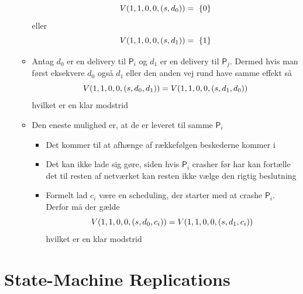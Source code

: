 \documentclass[a4, english]{article}
\begin{document}
\begin{itemize}
\begin{itemize}
\begin{equation*}
      V(1,1,0,0, (s,d_0)) = \ \{0\} \\
    \end{equation*}
    eller
    \begin{equation*}
      V(1,1,0,0, (s,d_1)) = \ \{1\} \\
    \end{equation*}
    \item Antag $d_0$ er en delivery til $\mathsf P_i$ og $d_1$ er en delivery til $\mathsf P_j$. Dermed hvis man først eksekvere $d_0$ også $d_1$ eller den anden vej rund have samme effekt så
    \begin{equation*}
      V(1,1,0,0, (s,d_0,d_1)) = V(1,1,0,0, (s,d_1,d_0)) \\
    \end{equation*}
    hvilket er en klar modstrid
    \item Den eneste mulighed er, at de er leveret til samme $\mathsf P_i$
    \begin{itemize}
    	\item Det kommer til at afhænge af rækkefølgen beskederne kommer i
      \item Det kan ikke lade sig gøre, siden hvis $\mathsf P_i$ crasher før har kan fortælle det til resten af netværket kan resten ikke vælge den rigtig beslutning
      \item Formelt lad $c_i$ være en scheduling, der starter med at crashe $\mathsf P_i$. Derfor må der gælde
    \begin{equation*}
      V(1,1,0,0, (s,d_0,c_i)) = V(1,1,0,0, (s,d_1,c_i)) \\
    \end{equation*}
    hvilket er en klar modstrid
    \end{itemize}
  \end{itemize}
\end{itemize} 
\newpage

\section{State-Machine Replications}
\end{document}
